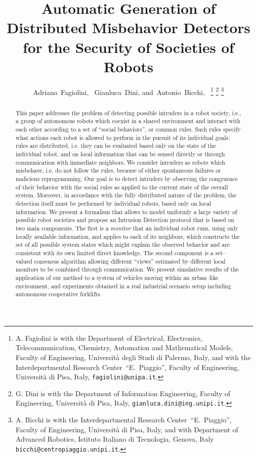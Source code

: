 \documentclass[journal, onecolumn, 12pt]{styles/IEEEtran}
\title{Automatic Generation of Distributed Misbehavior Detectors for the Security of Societies of Robots}
\author{Adriano~Fagiolini,~\IEEEmembership{Member,~IEEE,} Gianluca~Dini, and~Antonio~Bicchi,~\IEEEmembership{Fellow,~IEEE} \thanks{A. Fagiolini is with the Department of Electrical, Electronics, Telecommunication, Chemistry, Automation and Mathematical Models, Faculty of Engineering, Universit\`a degli Studi di Palermo, Italy, and with the Interdepartmental Research Center~``E.~Piaggio'', Faculty of Engineering, Universit\`a di Pisa, Italy, {\tt\small fagiolini@unipa.it}.} \thanks{G. Dini is with the Department of Information Engineering, Faculty of Engineering, Universit\`a di Pisa, Italy, {\tt\small gianluca.dini@ing.unipi.it}.} \thanks{A. Bicchi is with the Interdepartmental Research Center~``E.~Piaggio'', Faculty of Engineering, Universit\`a di Pisa, Italy, and with Department of Advanced Robotics, Istituto Italiano di Tecnologia, Genova, Italy {\tt\small bicchi@centropiaggio.unipi.it}.} 
}
\begin{document}
\maketitle

%
%
%



\begin{abstract}
This paper addresses the problem of detecting possible intruders in a robot society, i.e., a group of autonomous robots which coexist in a shared environment and interact with each other according to a set of ``social behaviors'', or common rules. Such rules specify what actions each robot is allowed to perform in the pursuit of its individual goals: rules are distributed, i.e. they can be evaluated based only on the state of the individual robot, and on local information that can be sensed directly or through communication with immediate neighbors. We consider intruders as robots which misbehave, i.e. do not follow the rules, because of either spontaneous failures or malicious reprogramming. Our goal is to detect intruders by observing the congruence of their behavior with the social rules as applied to the current state of the overall system.  Moreover, in accordance with the fully distributed nature of the problem, the detection itself must be performed by individual robots, based only on local information. We present a formalism that allows to model uniformly a large variety of possible robot societies and propose an Intrusion Detection protocol that is based on two main components. The first is a {\em  monitor} that an individual robot runs, using only locally available information, and applies to each of its neighbors, which constructs the set of all possible system states which might explain the observed behavior and are consistent with its own limited direct knowledge. The second component is a set--valued consensus algorithm allowing different ``views'' estimated by different local monitors to be combined through communication. We present simulative results of the application of our method to a system of vehicles moving within an urban--like environment, and experiments obtained in a real industrial scenario setup including autonomous cooperative forklifts.
%

\end{abstract}
\end{document}
